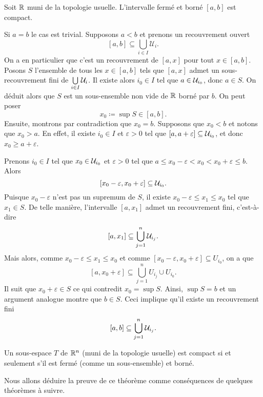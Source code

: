 \documentclass[french]{article}
\begin{document}
\begin{propo}
  Soit $\mathbb{R}$ muni de la topologie usuelle. L'intervalle fermé et borné $[a, b]$ est compact.

  \tcblower
  \begin{preuve}
    Si $a=b$ le cas est trivial. Supposons $a < b$ et prenons un recouvrement ouvert
    $$[a, b] \subseteq \bigcup_{i \in I} \mathcal{U}_i.$$
    On a en particulier que c'est un recouvrement de $[a, x]$ pour tout $x \in [a, b]$. Posons $S$ l'ensemble de tous les $x\in [a, b]$ tels que $[a, x]$ admet un sous-recouvrement fini de $\bigcup\limits_{i \in I} \mathcal{U}_i$. Il existe alors $i_0 \in I$ tel que $a \in \mathcal{U}_{i_0}$, donc $a \in S$.
    On déduit alors que $S$ est un sous-ensemble non vide de $\mathbb{R}$ borné par $b$. On peut poser
    $$x_0 \coloneq \sup S \in [a, b].$$
    Ensuite, montrons par contradiction que $x_0 = b$. Supposons que $x_0 < b$ et notons que $x_0 > a$. En effet, il existe  $i_0 \in I$ et $\varepsilon > 0$ tel que  $[a, a+\varepsilon] \subseteq \mathcal{U}_{i_0}$, et donc $x_0 \geq a + \varepsilon$.
    \par Prenons $i_0 \in I$ tel que $x_0 \in \mathcal{U}_{i_0}$ et $\varepsilon > 0$ tel que  $a \leq x_0 - \varepsilon < x_0 < x_0 + \varepsilon \leq b$. Alors
    $$[x_0 - \varepsilon, x_0 + \varepsilon] \subseteq \mathcal{U}_{i_0}.$$
    Puisque $x_0 - \varepsilon$ n'est pas un supremum de $S$, il existe $x_0 - \varepsilon \leq x_1 \leq x_0$ tel que $x_1 \in S$. De telle manière, l'intervalle $[a, x_1]$ admet un recouvrement fini, c'est-à-dire
    $$[a, x_1] \subseteq \bigcup_{j=1}^n \mathcal{U}_{i_j}.$$
    Mais alors, comme $x_0 - \varepsilon \leq x_1 \leq x_0$ et comme $[x_0 - \varepsilon, x_0+\varepsilon] \subseteq U_{i_0}$, on a que
    $$[a, x_0+\varepsilon] \subseteq \bigcup_{j=1}^n U_{i_j} \cup U_{i_0}.$$
    Il suit que $x_0 + \varepsilon \in S$ ce qui contredit $x_0 = \sup S$. Ainsi, $\sup S = b$ et un argument analogue montre que  $b \in S$. Ceci implique qu'il existe un recouvrement fini
    $$[a, b] \subseteq \bigcup_{j=1}^n \mathcal{U}_{i_j}.$$
  \end{preuve}
\end{propo}

\begin{theoreme}\label{thm:borel}
  Un sous-espace $T$ de $\mathbb{R}^n$ (muni de la topologie usuelle) est compact si et seulement s'il est fermé (comme un sous-ensemble) et borné.
\end{theoreme}
Nous allons déduire la preuve de ce théorème comme conséquences de quelques théorèmes à suivre.
\end{document}
